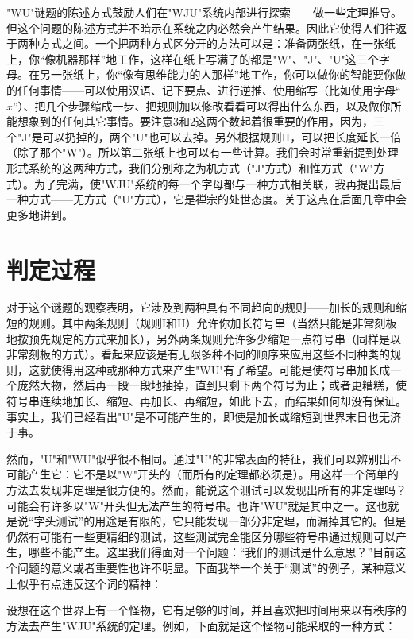 "WU"谜题的陈述方式鼓励人们在"WJU"系统内部进行探索——做一些定理推导。但这个问题的陈述方式并不暗示在系统之内必然会产生结果。因此它使得人们往返于两种方式之间。一个把两种方式区分开的方法可以是：准备两张纸，在一张纸上，你“像机器那样”地工作，这样在纸上写满了的都是"W"、"J"、"U"这三个字母。在另一张纸上，你“像有思维能力的人那样”地工作，你可以做你的智能要你做的任何事情——可以使用汉语、记下要点、进行逆推、使用缩写（比如使用字母“$x$”）、把几个步骤缩成一步、把规则加以修改看看可以得出什么东西，以及做你所能想象到的任何其它事情。要注意$3$和$2$这两个数起着很重要的作用，因为，三个"J"是可以扔掉的，两个"U"也可以去掉。另外根据规则II，可以把长度延长一倍（除了那个"W"）。所以第二张纸上也可以有一些计算。我们会时常重新提到处理形式系统的这两种方式，我们分别称之为机方式（"J"方式）和惟方式（"W"方式）。为了完满，使"WJU"系统的每一个字母都与一种方式相关联，我再提出最后一种方式——无方式（"U"方式），它是禅宗的处世态度。关于这点在后面几章中会更多地讲到。

\section{判定过程}

对于这个谜题的观察表明，它涉及到两种具有不同趋向的规则——加长的规则和缩短的规则。其中两条规则（规则I和II）允许你加长符号串（当然只能是非常刻板地按预先规定的方式来加长），另外两条规则允许多少缩短一点符号串（同样是以非常刻板的方式）。看起来应该是有无限多种不同的顺序来应用这些不同种类的规则，这就使得用这种或那种方式来产生"WU"有了希望。可能是使符号串加长成一个庞然大物，然后再一段一段地抽掉，直到只剩下两个符号为止；或者更糟糕，使符号串连续地加长、缩短、再加长、再缩短，如此下去，而结果如何却没有保证。事实上，我们已经看出"U"是不可能产生的，即使是加长或缩短到世界末日也无济于事。

然而，"U"和"WU"似乎很不相同。通过"U"的非常表面的特征，我们可以辨别出不可能产生它：它不是以"W"开头的（而所有的定理都必须是）。用这样一个简单的方法去发现非定理是很方便的。然而，能说这个测试可以发现出所有的非定理吗？可能会有许多以"W"开头但无法产生的符号串。也许"WU"就是其中之一。这也就是说“字头测试”的用途是有限的，它只能发现一部分非定理，而漏掉其它的。但是仍然有可能有一些更精细的测试，这些测试完全能区分哪些符号串通过规则可以产生，哪些不能产生。这里我们得面对一个问题：“我们的测试是什么意思？”目前这个问题的意义或者重要性也许不明显。下面我举一个关于“测试”的例子，某种意义上似乎有点违反这个词的精神：

设想在这个世界上有一个怪物，它有足够的时间，并且喜欢把时间用来以有秩序的方法去产生"WJU"系统的定理。例如，下面就是这个怪物可能采取的一种方式：

